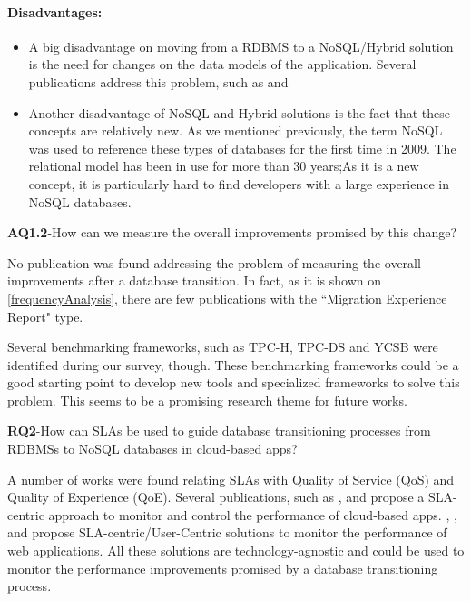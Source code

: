 \documentclass[conference, 10pt, a4paper]{IEEEtran}
\begin{document}
\paragraph*{Disadvantages:}
    \begin{itemize}
    \item A big disadvantage on moving from a RDBMS to a NoSQL/Hybrid solution is the need for changes on the data models of the application. Several publications address this problem, such as \cite{Schram:2012:MND:2384716.2384773} \cite{Cattell:2011:SSN:1978915.1978919} and \cite{Mohan:2013:HRI:2452376.2452378}
    \item Another disadvantage of NoSQL and Hybrid solutions is the fact that these concepts are relatively new. As we mentioned previously, the term NoSQL was used to reference these types of databases for the first time in 2009\cite{ericevans}. The relational model has been in use for more than 30 years;As it is a new concept, it is particularly hard to find developers with a large experience in NoSQL databases.
\end{itemize}
    
\bigskip
\noindent\textbf{AQ1.2}-How can we measure the overall improvements promised by this change?

No publication was found addressing the problem of measuring the overall improvements after a database transition. In fact, as it is shown on \ref{frequencyAnalysis}, there are few publications with the ``Migration Experience Report"  type. 

Several benchmarking frameworks, such as TPC-H, TPC-DS and YCSB were identified\cite{6616442} during our survey, though. These benchmarking frameworks could be a good starting point to develop new tools and specialized frameworks to solve this problem. This seems to be a promising research theme for future works.

\bigskip
\noindent\textbf{RQ2}-How can SLAs be used to guide database transitioning processes from RDBMSs to NoSQL databases in cloud-based apps?

A number of works were found relating SLAs with Quality of Service (QoS) and Quality of Experience (QoE). Several publications, such as \cite{Xiong:2012:DMR:2213598.2213614}, \cite{Konstantinou:2012:TEN:2213836.2213943} and \cite{Klems:2012:RQM:2477172.2477488} propose a SLA-centric approach to monitor and control the performance of cloud-based apps. 
\cite{6253526}, \cite{6461875}, \cite{6511780} and \cite{Xiong:2011:APA:2038916.2038931} propose SLA-centric/User-Centric solutions to monitor the performance of web applications. All these solutions are technology-agnostic and could be used to monitor the performance improvements promised by a database transitioning process.
\end{document}
